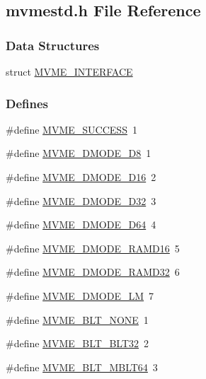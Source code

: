 \subsection{mvmestd.h File Reference}
\label{mvmestd_8h}
\subsubsection*{Data Structures}
\begin{DoxyCompactItemize}
\item 
struct \hyperlink{structMVME__INTERFACE}{MVME\_\-INTERFACE}
\end{DoxyCompactItemize}
\subsubsection*{Defines}
\begin{DoxyCompactItemize}
\item 
\#define \hyperlink{group__mvmestdinclude_ga1671785ba0bbf639935547e7b1d3f641}{MVME\_\-SUCCESS}~1
\item 
\#define \hyperlink{group__mvmestdinclude_ga7e9bd9d8731cf357b74b477d86e3871e}{MVME\_\-DMODE\_\-D8}~1
\item 
\#define \hyperlink{group__mvmestdinclude_ga36525e38132744a48e26d7ee2b158d2c}{MVME\_\-DMODE\_\-D16}~2
\item 
\#define \hyperlink{group__mvmestdinclude_ga1106eeff8cdbd2cfb5516f7feea8c1ff}{MVME\_\-DMODE\_\-D32}~3
\item 
\#define \hyperlink{group__mvmestdinclude_ga072f6459693256bff0c351153baf6dc5}{MVME\_\-DMODE\_\-D64}~4
\item 
\#define \hyperlink{group__mvmestdinclude_gad828794144a2e8bc886603ec200ae285}{MVME\_\-DMODE\_\-RAMD16}~5
\item 
\#define \hyperlink{group__mvmestdinclude_gaf33ae8d3aca31ae4679f0a12647071b8}{MVME\_\-DMODE\_\-RAMD32}~6
\item 
\#define \hyperlink{group__mvmestdinclude_ga9da3a119be8e2aaf29f8858495e6b2b8}{MVME\_\-DMODE\_\-LM}~7
\item 
\#define \hyperlink{group__mvmestdinclude_ga820b9a818f3f5b5741c6bd20ebf0cead}{MVME\_\-BLT\_\-NONE}~1
\item 
\#define \hyperlink{group__mvmestdinclude_ga27ecf7af5c7788bc6e59ad1084112759}{MVME\_\-BLT\_\-BLT32}~2
\item 
\#define \hyperlink{group__mvmestdinclude_ga29f0f94e8421c77f5bd0da963fbab2ab}{MVME\_\-BLT\_\-MBLT64}~3
\item 

\end{DoxyCompactItemize}
